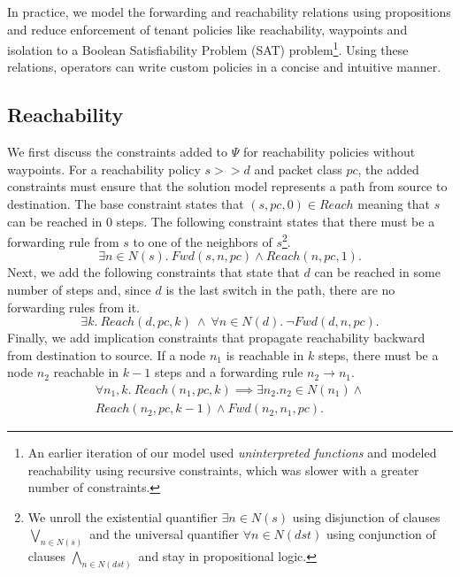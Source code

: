 In practice, we  
model the forwarding and reachability relations using propositions and
 reduce enforcement of tenant policies like reachability, waypoints 
 and isolation to a Boolean Satisfiability Problem (SAT) problem\footnote{
 	An earlier iteration of our model used \emph{uninterpreted functions} 
 	and modeled reachability using recursive constraints, 
	which was slower with a greater number of constraints.}. 
Using these
relations, operators can write custom policies in a concise and intuitive
manner. 

\subsection{Reachability} \label{sec:reach}
We first discuss the constraints added to $\Psi$
for reachability policies without waypoints.
For a reachability policy $s >> d$ and packet class $pc$, the added constraints must ensure that 
the solution model represents a path 
from source to destination. 
The base constraint states that $(s, pc,0) \in Reach$ meaning
that $s$ can be reached in $0$ steps. 
The following constraint states that there must be a forwarding rule from $s$ to one of
the neighbors of $s$\footnote{
	We unroll the existential quantifier $\exists n \in N(s)$ using disjunction of 
	clauses $\bigvee\limits_{n \in N(s)}$ and
	the universal quantifier $\forall n \in N(dst)$ using conjunction of clauses $\bigwedge\limits_{n \in N(dst)}$
	and stay in propositional logic.}.
\begin{equation} \label{eq:src}
	\exists n \in N(s).~Fwd(s, n, pc) \wedge Reach(n, pc, 1).
\end{equation}
Next, we add the following constraints that state that $d$ can be reached in some number of steps and,
since $d$ is the last switch in the path, there are no forwarding rules from it.
\begin{equation} \label{eq:dst}
	\exists k.~Reach(d, pc, k) \ \wedge \ \forall n \in N(d). \ \neg Fwd(d, n, pc).
\end{equation}
Finally, we add implication constraints that propagate reachability backward from destination to source. 
If a node $n_1$ is reachable in $k$ steps, there must be a node $n_2$ reachable in  $k-1$ steps and 
a forwarding rule $n_2 \rightarrow n_1$.
\begin{multline} \label{eq:bckprop}
\forall n_1,k.~ Reach(n_1,pc,k) \implies \exists n_2.  n_2 \in N(n_1) \wedge \\ Reach(n_2,pc,k-1) \wedge Fwd(n_2,n_1,pc).
\end{multline} 
